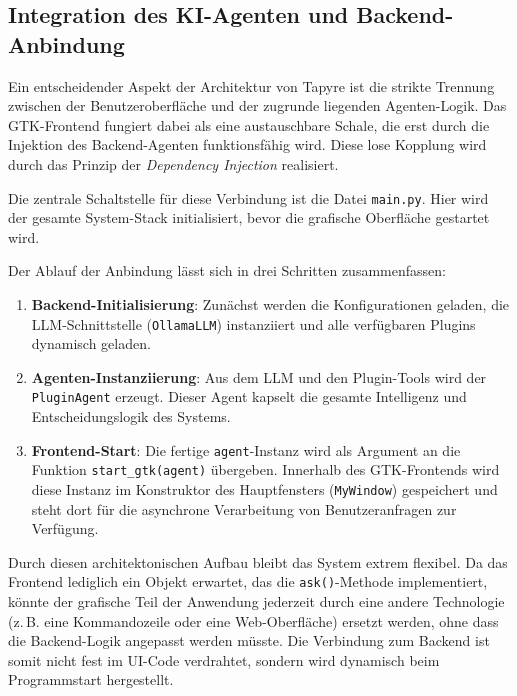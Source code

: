 \subsection{Integration des KI-Agenten und Backend-Anbindung}
Ein entscheidender Aspekt der Architektur von Tapyre ist die strikte Trennung zwischen der Benutzeroberfläche und der zugrunde liegenden Agenten-Logik. Das GTK-Frontend fungiert dabei als eine austauschbare Schale, die erst durch die Injektion des Backend-Agenten funktionsfähig wird. Diese lose Kopplung wird durch das Prinzip der \textit{Dependency Injection} realisiert.

Die zentrale Schaltstelle für diese Verbindung ist die Datei \texttt{main.py}. Hier wird der gesamte System-Stack initialisiert, bevor die grafische Oberfläche gestartet wird.



Der Ablauf der Anbindung lässt sich in drei Schritten zusammenfassen:
\begin{enumerate}
	\item \textbf{Backend-Initialisierung}: Zunächst werden die Konfigurationen geladen, die LLM-Schnittstelle (\texttt{OllamaLLM}) instanziiert und alle verfügbaren Plugins dynamisch geladen.
	\item \textbf{Agenten-Instanziierung}: Aus dem LLM und den Plugin-Tools wird der \texttt{PluginAgent} erzeugt. Dieser Agent kapselt die gesamte Intelligenz und Entscheidungslogik des Systems.
	\item \textbf{Frontend-Start}: Die fertige \texttt{agent}-Instanz wird als Argument an die Funktion \texttt{start\_gtk(agent)} übergeben. Innerhalb des GTK-Frontends wird diese Instanz im Konstruktor des Hauptfensters (\texttt{MyWindow}) gespeichert und steht dort für die asynchrone Verarbeitung von Benutzeranfragen zur Verfügung.
\end{enumerate}

Durch diesen architektonischen Aufbau bleibt das System extrem flexibel. Da das Frontend lediglich ein Objekt erwartet, das die \texttt{ask()}-Methode implementiert, könnte der grafische Teil der Anwendung jederzeit durch eine andere Technologie (z.\,B. eine Kommandozeile oder eine Web-Oberfläche) ersetzt werden, ohne dass die Backend-Logik angepasst werden müsste. Die Verbindung zum Backend ist somit nicht fest im UI-Code verdrahtet, sondern wird dynamisch beim Programmstart hergestellt.

